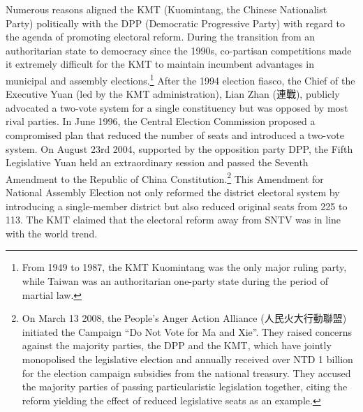 Numerous reasons aligned the KMT (Kuomintang, the Chinese Nationalist Party) politically with the DPP (Democratic Progressive Party) with regard to the agenda of promoting electoral reform. During the transition from an authoritarian state to democracy since the 1990s, co-partisan competitions made it extremely difficult for the KMT to maintain incumbent advantages in municipal and assembly elections.\footnote{From 1949 to 1987, the KMT Kuomintang was the only major ruling party, while Taiwan was an authoritarian one-party state during the period of martial law.} After the 1994 election fiasco, the Chief of the Executive Yuan (led by the KMT administration), Lian Zhan (連戰), publicly advocated a two-vote system for a single constituency but was opposed by most rival parties. In June 1996, the Central Election Commission proposed a compromised plan that reduced the number of seats and introduced a two-vote system. On August 23rd 2004, supported by the opposition party DPP, the Fifth Legislative Yuan held an extraordinary session and passed the Seventh Amendment to the Republic of China Constitution.\footnote{On March 13 2008, the People's Anger Action Alliance (人民火大行動聯盟) initiated the Campaign ``Do Not Vote for Ma and Xie''. They raised concerns against the majority parties, the DPP and the KMT, which have jointly monopolised the legislative election and annually received over NTD 1 billion for the election campaign subsidies from the national treasury. They accused the majority parties of passing particularistic legislation together, citing the reform yielding the effect of reduced legislative seats as an example.} This Amendment for National Assembly Election not only reformed the district electoral system by introducing a single-member district but also reduced original seats from 225 to 113. The KMT claimed that the electoral reform away from SNTV was in line with the world trend.

